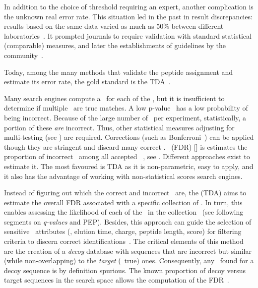 In addition to the choice of threshold requiring an expert,
another complication is the unknown real error rate.
This situation led in the past in result discrepancies:
results based on the same data varied
as much as 50\% between different laboratories~.
It prompted journals to require validation
with standard statistical (comparable) measures,
and later the establishments of guidelines by the
community~.\mybr\


Today, among the many methods that validate the peptide assignment and
estimate its error rate,
the gold standard is the \gls{TDA}~.\mybr\

Many search engines compute a \pval\ for each of the \psms,
but it is insufficient to determine if multiple \psms\ are true matches.
A low p-value \psm\ has a low probability of being incorrect.
Because of the large number of \psms\ per experiment,
statistically, a portion of these \emph{are} incorrect.
Thus, other statistical measures
adjusting for multi-testing (see )
are required.
Corrections (such as Bonferroni~) can be applied
though they are stringent and discard many correct \psms.
~(\gls{FDR}) $[$\citet*{Benjamini1995-nf}$]$ is
estimates the proportion of incorrect \psms\
among all accepted \psms~,
see \Cref{eq:fdr-prot}.
Different approaches exist to estimate it.
The most favoured is \gls{TDA}
as it is non-parametric, easy to apply, and
it also has the advantage of working with non-statistical scores search engines.\mybr\

Instead of figuring out which the correct and incorrect \psms\ are,
the \glsentrydesc{TDA} (\gls{TDA}) aims to estimate
the overall \gls{FDR} associated with a specific collection of \psms.
In turn, this enables assessing the likelihood of each of the \psms\
in the collection~
(see following segments on \emph{q-values} and \gls{PEP}).
Besides, this approach can guide
the selection of sensitive \psm\ attributes
(\eg, elution time, charge, peptide length, score)
for filtering criteria to discern correct identifications~.
The critical elements of this method are
the creation of a \emph{decoy} database with sequences
that are incorrect but similar (while non-overlapping)
to the \emph{target} (\ie\ true) ones.
Consequently, any \psm\ found for a decoy sequence is by definition spurious.
The known proportion of decoy versus target sequences in the search space allows
the computation of the \gls{FDR}~\mycite{Elias2007-wi,Elias2010-kp}.\mybr\
\vspace{-9mm}

